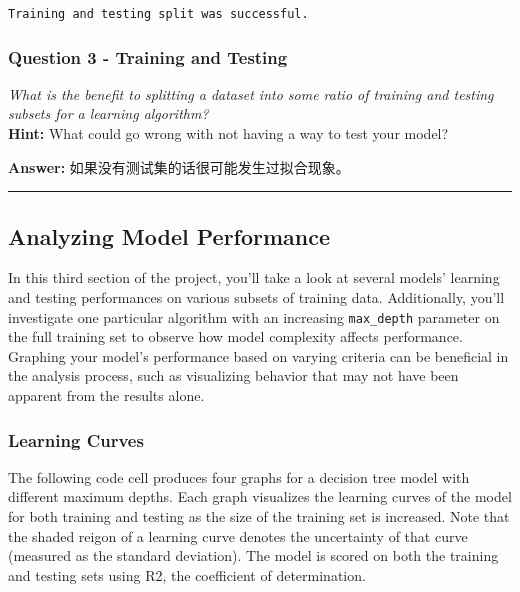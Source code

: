 \documentclass{article}
\begin{document}
    \begin{Verbatim}[commandchars=\\\{\}]
Training and testing split was successful.
    \end{Verbatim}

    \subsubsection{Question 3 - Training and
Testing}\label{question-3---training-and-testing}

\emph{What is the benefit to splitting a dataset into some ratio of
training and testing subsets for a learning algorithm?}\\
\textbf{Hint:} What could go wrong with not having a way to test your
model?

    \textbf{Answer: } 如果没有测试集的话很可能发生过拟合现象。

    \begin{center}\rule{0.5\linewidth}{\linethickness}\end{center}

\subsection{Analyzing Model
Performance}\label{analyzing-model-performance}

In this third section of the project, you'll take a look at several
models' learning and testing performances on various subsets of training
data. Additionally, you'll investigate one particular algorithm with an
increasing \texttt{\textquotesingle{}max\_depth\textquotesingle{}}
parameter on the full training set to observe how model complexity
affects performance. Graphing your model's performance based on varying
criteria can be beneficial in the analysis process, such as visualizing
behavior that may not have been apparent from the results alone.

    \subsubsection{Learning Curves}\label{learning-curves}

The following code cell produces four graphs for a decision tree model
with different maximum depths. Each graph visualizes the learning curves
of the model for both training and testing as the size of the training
set is increased. Note that the shaded reigon of a learning curve
denotes the uncertainty of that curve (measured as the standard
deviation). The model is scored on both the training and testing sets
using R2, the coefficient of determination.
\end{document}
